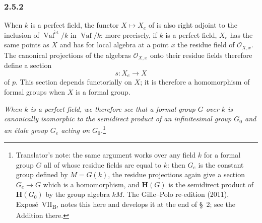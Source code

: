 
\subsubsection*{2.5.2}
\label{sga3:VIIB:2.5.2}

When \(k\) is a perfect field, the functor \(X\mapsto X_e\) of
 is also right adjoint to the inclusion of
\(\operatorname{Vaf}^{\mathrm{\acute{e}t}}/k\) in \(\operatorname{Vaf}/k\):
more precisely, if \(k\) is a perfect field, \(X_e\) has the same points
as \(X\) and has for local algebra at a point \(x\) the residue field of
\(\mathcal O_{X,x}\). The canonical projections of the algebras
\(\mathcal O_{X,x}\) onto their residue fields therefore define a section
\[
  s:X_e\longrightarrow X
\]
of \(p\). This section depends functorially on \(X\); it is therefore a
homomorphism of formal groups when \(X\) is a formal group.

\medskip
\noindent
{}
\label{sga3:VIIB:2.5.2:proposition}
{\itshape When \(k\) is a perfect field, we therefore see that a formal
group \(G\) over \(k\) is canonically isomorphic to the semidirect product
of an infinitesimal group \(G_0\) and an étale group \(G_e\) acting on
\(G_0\).}\footnote{Translator's note: the same argument works over any field \(k\) for a formal group
\(G\) all of whose residue fields are equal to \(k\): then \(G_e\) is the constant group defined by
\(M=G(k)\), the residue projections again give a section \(G_e\to G\) which is a homomorphism, and
\(\mathbf H(G)\) is the semidirect product of \(\mathbf H(G_0)\) by the group algebra \(kM\). The
Gille--Polo re-edition (2011), Expos\'e~VII\textsubscript{B}, notes this here and develops it at the end of
\S~2; see the Addition there.}

